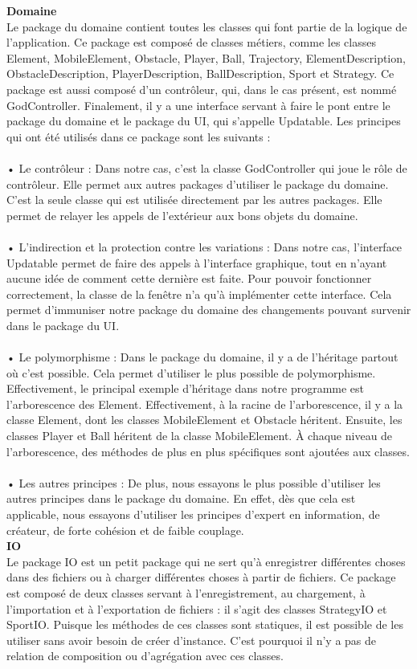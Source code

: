 \textbf{Domaine}\\
Le package du domaine contient toutes les classes qui font partie de la logique de l’application. Ce package est composé de classes métiers, comme les classes Element, MobileElement, Obstacle, Player, Ball, Trajectory, ElementDescription, ObstacleDescription, PlayerDescription, BallDescription, Sport et Strategy. Ce package est aussi composé d’un contrôleur, qui, dans le cas présent, est nommé GodController. Finalement, il y a une interface servant à faire le pont entre le package du domaine et le package du UI, qui s’appelle Updatable. Les principes qui ont été utilisés dans ce package sont les suivants :\\
\\•	Le contrôleur : Dans notre cas, c’est la classe GodController qui joue le rôle de contrôleur. Elle permet aux autres packages d’utiliser le package du domaine. C’est la seule classe qui est utilisée directement par les autres packages. Elle permet de relayer les appels de l’extérieur aux bons objets du domaine.\\
\\•	L’indirection et la protection contre les variations : Dans notre cas, l’interface Updatable permet de faire des appels à l’interface graphique, tout en n’ayant aucune idée de comment cette dernière est faite. Pour pouvoir fonctionner correctement, la classe de la fenêtre n’a qu’à implémenter cette interface. Cela permet d’immuniser notre package du domaine des changements pouvant survenir dans le package du UI.\\
\\•	Le polymorphisme : Dans le package du domaine, il y a de l’héritage partout où c’est possible. Cela permet d’utiliser le plus possible de polymorphisme. Effectivement, le principal exemple d’héritage dans notre programme est l’arborescence des Element. Effectivement, à la racine de l’arborescence, il y a la classe Element, dont les classes MobileElement et Obstacle héritent. Ensuite, les classes Player et Ball héritent de la classe MobileElement. À chaque niveau de l’arborescence, des méthodes de plus en plus spécifiques sont ajoutées aux classes.\\
\\•	Les autres principes : De plus, nous essayons le plus possible d’utiliser les autres principes dans le package du domaine. En effet, dès que cela est applicable, nous essayons d’utiliser les principes d’expert en information, de créateur, de forte cohésion et de faible couplage.\\

\textbf{IO}\\
Le package IO est un petit package qui ne sert qu’à enregistrer différentes choses dans des fichiers ou à charger différentes choses à partir de fichiers. Ce package est composé de deux classes servant à l’enregistrement, au chargement, à l’importation et à l’exportation de fichiers : il s’agit des classes StrategyIO et SportIO. Puisque les méthodes de ces classes sont statiques, il est possible de les utiliser sans avoir besoin de créer d’instance. C’est pourquoi il n’y a pas de relation de composition ou d’agrégation avec ces classes.
